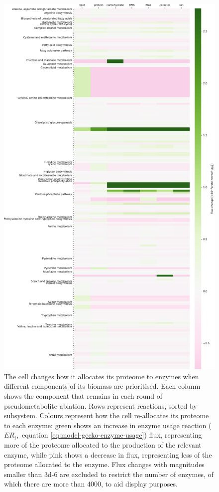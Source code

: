 \begin{figure}
  \centering
  \includegraphics[width=.8\linewidth]{abl_vs_enz_use_plots_adapted}
  \caption{
    The cell changes how it allocates its proteome to enzymes when different components of its biomass are prioritised.
    Each column shows the component that remains in each round of pseudometabolite ablation.
    Rows represent reactions, sorted by subsystem.
    Colours represent how the cell re-allocates its proteome to each enzyme: green shows an increase in enzyme usage reaction ($ER_{i}$,~equation \ref{eq:model-gecko-enzyme-usage}) flux, representing more of the proteome allocated to the production of the relevant enzyme, while pink shows a decrease in flux, representing less of the proteome allocated to the enzyme.
    Flux changes with magnitudes smaller than \SI{3d-6}{\mmolgdw} are excluded to restrict the number of enzymes, of which there are more than \num{4000}, to aid display purposes.
  }
  \label{fig:model-ablate-enz-use}
\end{figure}

